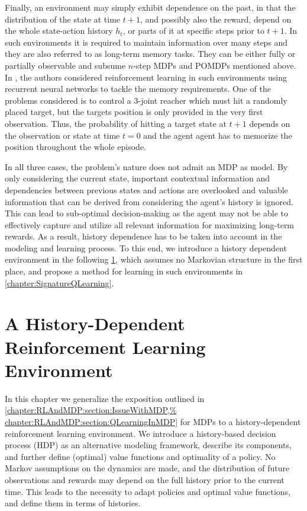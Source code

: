 \documentclass[
    a4paper,
    11pt,
    bibliography=totoc,
    listof=totoc,      
    headinclude=true,
    cleardoublepage=empty,
]{scrbook}
\theoremstyle{plain}
\theoremstyle{definition}
\theoremstyle{remark}
\begin{document}
Finally, an environment may simply exhibit dependence on the past, in that
the distribution of the state at time $t+1$, and possibly also the reward,
depend on the whole state-action history $h_t$, or parts of it
at specific steps prior to $t+1$. In such environments it is required to
maintain information over many steps and they are also referred to as 
long-term memory tasks. They can be either fully or partially observable and
subsume $n$-step MDPs and POMDPs mentioned above. 
In \cite{heess2015_mcwrnn}, the authors considered reinforcement learning in
such environments using recurrent neural networks to tackle the memory
requirements. One of the problems considered is to control a 3-joint reacher
which must hit a randomly placed target, but the targets position is only
provided in the very first observation. Thus, the probability of hitting a
target state at $t+1$ depends on the observation or state at time $t=0$ and
the agent agent has to memorize the position throughout the whole episode.

In all three cases, the problem's nature does not admit an MDP as model. 
By only considering the current state, important contextual
information and dependencies between previous states and actions are
overlooked and valuable information that can be derived from considering the
agent's history is ignored. This can lead to sub-optimal decision-making as the
agent may not be able to effectively capture and utilize all relevant
information for maximizing long-term rewards. As a result, history dependence 
has to be taken into account in the modeling and learning process. To this 
end, we introduce a history dependent environment in the following
\cref{chapter:HistoryRLEnvironment}, which assumes no Markovian structure in
the first place, and propose a method for learning in such environments in
\cref{chapter:SignatureQLearning}.



\chapter[A History-Dependent RL Environment]{A History-Dependent Reinforcement Learning Environment} 
\label{chapter:HistoryRLEnvironment}

In this chapter we generalize the exposition outlined in 
\cref{chapter:RLAndMDP:section:IssueWithMDP,%
chapter:RLAndMDP:section:QLearningInMDP} for MDPs to a history-dependent 
reinforcement learning environment. We introduce a history-based decision 
process (HDP) as an alternative modeling framework, describe its components, 
and further define (optimal) value functions and optimality of a policy. No 
Markov assumptions on the dynamics are made, and the distribution of
future observations and rewards may depend on the full history prior to the
current time. This leads to the necessity to adapt policies and optimal value
functions, and define them in terms of histories.
\end{document}
